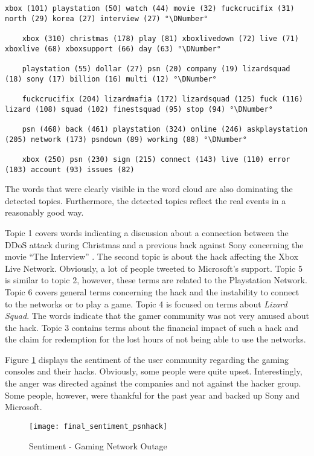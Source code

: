 \begin{lstlisting}[caption={[Topic Model for Gaming Network Outage] Topic Model for Gaming Network Outage}, label={lst:topic-model-network}, float=h]
	xbox (101) playstation (50) watch (44) movie (32) fuckcrucifix (31) north (29) korea (27) interview (27) °\DNumber°

	xbox (310) christmas (178) play (81) xboxlivedown (72) live (71) xboxlive (68) xboxsupport (66) day (63) °\DNumber°

	playstation (55) dollar (27) psn (20) company (19) lizardsquad (18) sony (17) billion (16) multi (12) °\DNumber°

	fuckcrucifix (204) lizardmafia (172) lizardsquad (125) fuck (116) lizard (108) squad (102) finestsquad (95) stop (94) °\DNumber°

	psn (468) back (461) playstation (324) online (246) askplaystation (205) network (173) psndown (89) working (88) °\DNumber°

	xbox (250) psn (230) sign (215) connect (143) live (110) error (103) account (93) issues (82)
\end{lstlisting}

The words that were clearly visible in the word cloud are also dominating the detected topics. Furthermore, the detected topics reflect the real events in a reasonably good way.

Topic 1 covers words indicating a discussion about a connection between the DDoS attack during Christmas and a previous hack against Sony concerning the movie \enquote{The Interview} \cite{bbc2014the}. The second topic is about the hack affecting the Xbox Live Network. Obviously, a lot of people tweeted to Microsoft's support. Topic 5 is similar to topic 2, however, these terms are related to the Playstation Network. Topic 6 covers general terms concerning the hack and the instability to connect to the networks or to play a game. Topic 4 is focused on terms about \textit{Lizard Squad}. The words indicate that the gamer community was not very amused about the hack. Topic 3 contains terms about the financial impact of such a hack and the claim for redemption for the lost hours of not being able to use the networks.

Figure \ref{fig:network-outage-sentiment} displays the sentiment of the user community regarding the gaming consoles and their hacks. Obviously, some people were quite upset. Interestingly, the anger was directed against the companies and not against the hacker group. Some people, however, were thankful for the past year and backed up Sony and Microsoft.

\begin{figure}[H]
  \centering
        \texttt{[image: final\_sentiment\_psnhack]}
  \caption[Sentiment - Gaming Network Outage]{Sentiment - Gaming Network Outage}
  \label{fig:network-outage-sentiment}
  \vspace{-1.3em}
\end{figure}